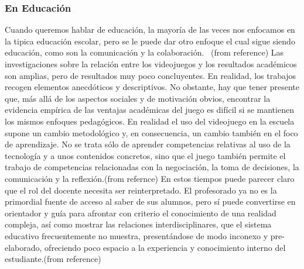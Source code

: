 \documentclass{bmcart}
\begin{document}
\subsubsection*{En Educación}
Cuando queremos hablar de educación, la mayoría de las veces nos enfocamos en la tipica educación escolar, pero se le puede dar otro enfoque el cual sigue siendo  educación, como son la comunicación y la colaboración.
\ (from reference\cite {sanchez2008videojuegos})
\newline
\newline
Las investigaciones sobre la relación entre los videojuegos y los resultados académicos son amplias, pero de resultados muy poco concluyentes. En realidad, los trabajos recogen elementos anecdóticos y descriptivos. No obstante, hay que tener presente que, más allá de los aspectos sociales y de motivación obvios, encontrar la evidencia empírica de las ventajas académicas del juego es difícil si se mantienen los mismos enfoques pedagógicos. En realidad el uso del videojuego en la escuela supone un cambio metodológico y, en consecuencia, un cambio también en el foco de aprendizaje. No se trata sólo de aprender competencias relativas al uso de la tecnología y a unos contenidos concretos, sino que el juego también permite el trabajo de competencias relacionadas con la negociación, la toma de decisiones, la comunicación y la reflexión.(from refernce\cite{salvat2008videojuegos})
\newline
\newline
En estos tiempos puede parecer claro que el rol del docente necesita ser reinterpretado. El profesorado ya no es la primordial fuente de acceso al saber de sus alumnos, pero sí puede convertirse en orientador y guía para afrontar con criterio el conocimiento de una realidad compleja, así como mostrar las relaciones interdisciplinares, que el sistema educativo frecuentemente no muestra, presentándose de modo inconexo y pre-elaborado, ofreciendo poco espacio a la experiencia y conocimiento interno del estudiante.(from reference\cite{ruiz2012aprendiendo})
\end{document}
